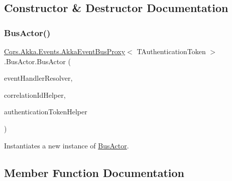 \subsection{Constructor \& Destructor Documentation}
\mbox{\label{classCqrs_1_1Akka_1_1Events_1_1AkkaEventBusProxy_1_1BusActor_aeb7cebaad75d810375d0adb82848974a_aeb7cebaad75d810375d0adb82848974a}} 
\subsubsection{\texorpdfstring{Bus\+Actor()}{BusActor()}}
{\footnotesize\ttfamily \hyperlink{classCqrs_1_1Akka_1_1Events_1_1AkkaEventBusProxy}{Cqrs.\+Akka.\+Events.\+Akka\+Event\+Bus\+Proxy}$<$ T\+Authentication\+Token $>$.Bus\+Actor.\+Bus\+Actor (\begin{DoxyParamCaption}\item[{\hyperlink{interfaceCqrs_1_1Akka_1_1Events_1_1IAkkaEventPublisher}{I\+Akka\+Event\+Publisher}$<$ T\+Authentication\+Token $>$}]{event\+Handler\+Resolver,  }\item[{I\+Correlation\+Id\+Helper}]{correlation\+Id\+Helper,  }\item[{\hyperlink{interfaceCqrs_1_1Authentication_1_1IAuthenticationTokenHelper}{I\+Authentication\+Token\+Helper}$<$ T\+Authentication\+Token $>$}]{authentication\+Token\+Helper }\end{DoxyParamCaption})}



Instantiates a new instance of \hyperlink{classCqrs_1_1Akka_1_1Events_1_1AkkaEventBusProxy_1_1BusActor}{Bus\+Actor}. 



\subsection{Member Function Documentation}
\mbox{\label{classCqrs_1_1Akka_1_1Events_1_1AkkaEventBusProxy_1_1BusActor_a90a6f4b440d2e2d9b997f6280ce67921_a90a6f4b440d2e2d9b997f6280ce67921}} 
